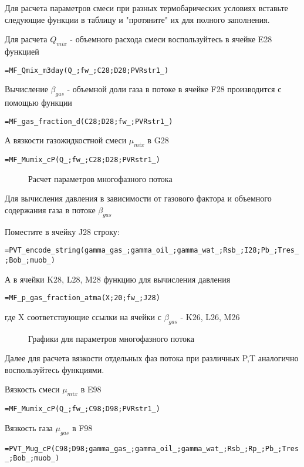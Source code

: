Для расчета параметров смеси при разных термобарических условиях вставьте следующие функции в таблицу и "протяните" их для полного заполнения.

Для расчета $Q_{mix}$ - объемного расхода смеси воспользуйтесь в ячейке E28 функцией

{ \small  \texttt{=MF\_Qmix\_m3day(Q\_;fw\_;C28;D28;PVRstr1\_)}}

Вычисление $\beta_{gas}$ - объемной доли газа в потоке в ячейке F28 производится с помощью функции

{ \small  \texttt{=MF\_gas\_fraction\_d(C28;D28;fw\_;PVRstr1\_)}}

А вязкости газожидкостной смеси $\mu_{mix}$ в G28

{ \small  \texttt{=MF\_Mumix\_cP(Q\_;fw\_;C28;D28;PVRstr1\_)}}

\begin{figure}[h!]
	\center{\texttt{[image: Ex30\_2]}}
	\caption{Расчет параметров многофазного потока}
	\label{ris:Ex30_2}
\end{figure}

Для вычисления давления в зависимости от газового фактора и объемного содержания газа в потоке $\beta_{gas}$

Поместите в ячейку J28 строку:

{ \small  \texttt{=PVT\_encode\_string(gamma\_gas\_;gamma\_oil\_;gamma\_wat\_;Rsb\_;I28;Pb\_;Tres\_;Bob\_;muob\_)}}

А в ячейки K28, L28, M28 функцию для вычисления давления 

{ \small  \texttt{=MF\_p\_gas\_fraction\_atma(X;20;fw\_;J28)}}

где X соответствующие ссылки на ячейки с $\beta_{gas}$ - K26, L26, M26

\begin{figure}[h!]
	\center{\texttt{[image: Ex30\_3]}}
	\caption{Графики для параметров многофазного потока}
	\label{ris:Ex30_3}
\end{figure}

Далее для расчета вязкости отдельных фаз потока при различных P,T аналогично воспользуйтесь функциями.

Вязкость смеси $\mu_{mix}$ в E98

{ \small  \texttt{=MF\_Mumix\_cP(Q\_;fw\_;C98;D98;PVRstr1\_)}}

Вязкость газа $\mu_{gas}$ в F98

{ \small  \texttt{=PVT\_Mug\_cP(C98;D98;gamma\_gas\_;gamma\_oil\_;gamma\_wat\_;Rsb\_;Rp\_;Pb\_;Tres\_;Bob\_;muob\_)}}

